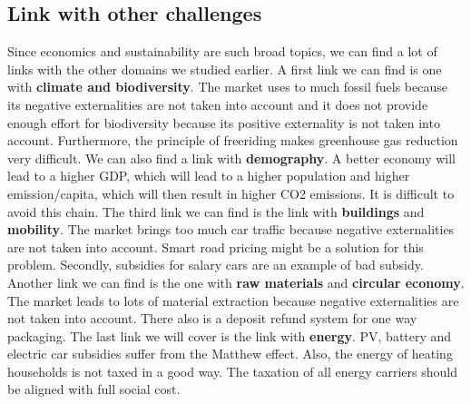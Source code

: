 \documentclass[../summary.tex]{subfiles}
\begin{document}
	  \subsection{Link with other challenges}
	  Since economics and sustainability are such broad topics, we can find a lot of links with the other domains we studied earlier. A first link we can find is one with \textbf{climate and biodiversity}. The market uses to much fossil fuels because its negative externalities are not taken into account and it does not provide enough effort for biodiversity because its positive externality is not taken into account. Furthermore, the principle of freeriding makes greenhouse gas reduction very difficult. We can also find a link with \textbf{demography}. A better economy will lead to a higher GDP, which will lead to a higher population and higher emission/capita, which will then result in higher CO2 emissions. It is difficult to avoid this chain. The third link we can find is the link with \textbf{buildings} and \textbf{mobility}. The market brings too much car traffic because negative externalities are not taken into account. Smart road pricing might be a solution for this problem. Secondly, subsidies for salary cars are an example of bad subsidy. Another link we can find is the one with \textbf{raw materials} and \textbf{circular economy}. The market leads to lots of material extraction because negative externalities are not taken into account. There also is a deposit refund system for one way packaging. The last link we will cover is the link with \textbf{energy}. PV, battery and electric car subsidies suffer from the Matthew effect. Also, the energy of heating households is not taxed in a good way. The taxation of all energy carriers
	  should be aligned with full social cost.
	
\end{document}
